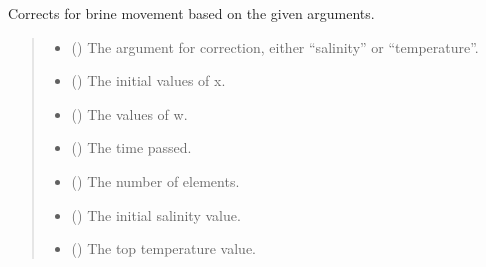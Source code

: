 \documentclass[a4paper,11pt,english,openany]{sphinxmanual}
\begin{document}
\begin{fulllineitems}
\label{\detokenize{api/spyice.rhs:src.spyice.rhs.correct_for_brine_movement}}
\pysigstartsignatures
\pysiglinewithargsret
{}
{\sphinxparamcomma {}\sphinxparamcomma {}\sphinxparamcomma {}\sphinxparamcomma {}\sphinxparamcomma {}\sphinxparamcomma {}}
{}
\pysigstopsignatures
\sphinxAtStartPar
Corrects for brine movement based on the given arguments.
\begin{quote}\begin{description}
\begin{itemize}
\item {} 
\sphinxAtStartPar
{} () \textendash{} The argument for correction, either “salinity” or “temperature”.

\item {} 
\sphinxAtStartPar
{} () \textendash{} The initial values of x.

\item {} 
\sphinxAtStartPar
{} () \textendash{} The values of w.

\item {} 
\sphinxAtStartPar
{} () \textendash{} The time passed.

\item {} 
\sphinxAtStartPar
{} () \textendash{} The number of elements.

\item {} 
\sphinxAtStartPar
{} () \textendash{} The initial salinity value.

\item {} 
\sphinxAtStartPar
{} () \textendash{} The top temperature value.


\end{itemize}
\end{description}
\end{quote}
\end{fulllineitems}
\end{document}

